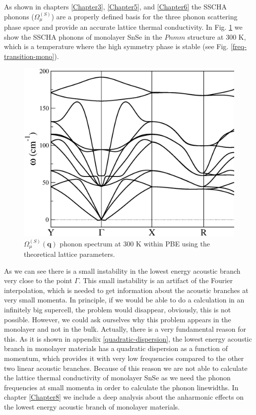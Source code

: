 As shown in chapters \ref{Chapter3}, \ref{Chapter5}, and \ref{Chapter6} the SSCHA phonons ($\Omega^{(S)}_{\mu}$) are 
a properly defined basis for the three phonon scattering phase space and provide an accurate lattice thermal 
conductivity. In Fig. \ref{sscha-freq-mono} we show the SSCHA phonons of monolayer SnSe in the $Pnmm$ structure at 
$300$ K, which is a temperature where the high symmetry phase is stable (see Fig. \ref{freq-transition-mono}).
\begin{figure}[h]
\includegraphics[width=\linewidth]{Figures/sscha-mono.eps}
\caption[Anharmonic phonons in monolayer SnSe.]{$\Omega^{(S)}_{\mu}(\boldsymbol{q})$ phonon spectrum at $300$ K 
within PBE using the theoretical lattice parameters.}
\label{sscha-freq-mono}
\end{figure}
As we can see there is a small instability in the lowest energy acoustic branch very close to the point $\Gamma$. 
This small instability is an artifact of the Fourier interpolation, which is needed to get information about the 
acoustic branches at very small momenta. In principle, if we would be able to do a calculation in an infinitely big 
supercell, the problem would disappear, obviously, this is not possible. However, we could ask ourselves why this 
problem appears in the monolayer and not in the bulk. Actually, there is a very fundamental reason for this. As it 
is shown in appendix \ref{quadratic-dispersion}, the lowest energy acoustic branch in monolayer materials has a 
quadratic dispersion as a function of momentum, which provides it with very low frequencies compared to the other 
two linear acoustic branches. Because of this reason we are not able to calculate the lattice thermal conductivity 
of monolayer SnSe as we need the phonon frequencies at small momenta in order to calculate the phonon linewidths. In
chapter \ref{Chapter8} we include a deep analysis about the anharmonic effects on the lowest energy acoustic branch 
of monolayer materials.

